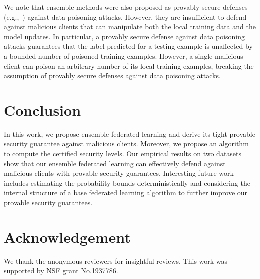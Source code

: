 \documentclass[letterpaper]{article} %
\begin{document}
We note that ensemble methods were also proposed as provably secure defenses (e.g.,~\cite{jia2020intrinsic}) against data poisoning attacks. However, they are insufficient to defend against malicious clients that can manipulate both the local training data and the model updates. In particular, a provably secure defense against data poisoning attacks guarantees that the label predicted for a testing example is unaffected by a bounded number of poisoned training examples. However, a single malicious client can poison an arbitrary number of its local training examples, breaking the assumption of provably secure defenses against data poisoning attacks. 


\section{Conclusion}
In this work, we propose ensemble federated learning and derive its tight provable security guarantee against malicious clients. Moreover, we propose an algorithm to compute the certified security levels. Our empirical results on two datasets show that our ensemble federated learning can effectively defend against malicious clients with provable security guarantees.  Interesting future work includes estimating the probability bounds deterministically and considering the internal structure of a base federated learning algorithm to further improve our provable security guarantees. 


\section*{Acknowledgement}
We thank the anonymous reviewers for insightful reviews. This work was supported by NSF grant No.1937786.




\onecolumn
\appendix

\newpage 
\end{document}
